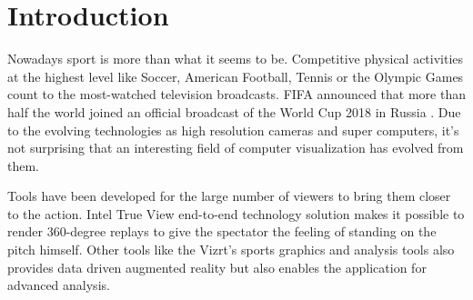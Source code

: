\chapter{Introduction}
Nowadays sport is more than what it seems to be. Competitive physical activities at the highest level like Soccer, American Football, Tennis or the Olympic Games count to the most-watched television broadcasts. FIFA announced that more than half the world joined an official broadcast of the World Cup 2018 in Russia \cite{worldcup}. Due to the evolving technologies as high resolution cameras and super computers, it's not surprising that an interesting field of computer visualization has evolved from them. 

Tools have been developed for the large number of viewers to bring them closer to the action. Intel True View end-to-end technology solution \cite{intel} makes it possible to render 360-degree replays to give the spectator the feeling of standing on the pitch himself. Other tools like the Vizrt's sports graphics and analysis tools \cite{vizrt} also provides data driven augmented reality but also enables the application for advanced analysis.

